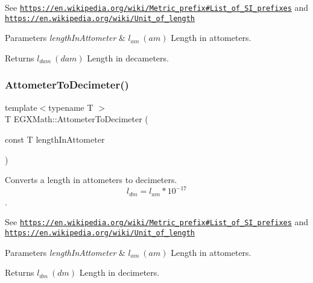 See \href{https://en.wikipedia.org/wiki/Metric_prefix#List_of_SI_prefixes}{\tt https\+://en.\+wikipedia.\+org/wiki/\+Metric\+\_\+prefix\#\+List\+\_\+of\+\_\+\+S\+I\+\_\+prefixes} and \href{https://en.wikipedia.org/wiki/Unit_of_length}{\tt https\+://en.\+wikipedia.\+org/wiki/\+Unit\+\_\+of\+\_\+length} 
\begin{DoxyParams}{Parameters}
{\em length\+In\+Attometer} & $ l_{am}\ (am)$ Length in attometers. \\
\hline
\end{DoxyParams}
\begin{DoxyReturn}{Returns}
$ l_{dam}\ (dam)$ Length in decameters. 
\end{DoxyReturn}
\mbox{\label{group___e_g_x_math-_conversions-_length_conversions-_s_i-_attometer-_s_i_gaa819fb588dcc42855d8e40578b54527e}} 
\subsubsection{\texorpdfstring{Attometer\+To\+Decimeter()}{AttometerToDecimeter()}}
{\footnotesize\ttfamily template$<$typename T $>$ \\
T E\+G\+X\+Math\+::\+Attometer\+To\+Decimeter (\begin{DoxyParamCaption}\item[{const T}]{length\+In\+Attometer }\end{DoxyParamCaption})}



Converts a length in attometers to decimeters. \[ l_{dm}=l_{am} * 10^{-17} \]. 

See \href{https://en.wikipedia.org/wiki/Metric_prefix#List_of_SI_prefixes}{\tt https\+://en.\+wikipedia.\+org/wiki/\+Metric\+\_\+prefix\#\+List\+\_\+of\+\_\+\+S\+I\+\_\+prefixes} and \href{https://en.wikipedia.org/wiki/Unit_of_length}{\tt https\+://en.\+wikipedia.\+org/wiki/\+Unit\+\_\+of\+\_\+length} 
\begin{DoxyParams}{Parameters}
{\em length\+In\+Attometer} & $ l_{am}\ (am)$ Length in attometers. \\
\hline
\end{DoxyParams}
\begin{DoxyReturn}{Returns}
$ l_{dm}\ (dm)$ Length in decimeters. 
\end{DoxyReturn}
\mbox{\label{group___e_g_x_math-_conversions-_length_conversions-_s_i-_attometer-_s_i_gaca9be6820446effaa50024d2ccc3eea8}} 
